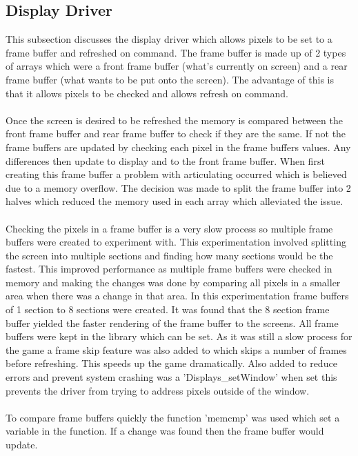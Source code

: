 \documentclass[a4paper,12pt]{article}
\begin{document}
\subsection{Display Driver}
\begin{flushleft}
This subsection discusses the display driver which allows pixels to be set to a frame buffer and refreshed on command. The frame buffer is made up of 2 types of arrays which were a front frame buffer (what's currently on screen) and a rear frame buffer (what wants to be put onto the screen). The advantage of this is that it allows pixels to be checked and allows refresh on command. 
\\ \- \\
 Once the screen is desired to be refreshed the memory is compared between the front frame buffer and rear frame buffer to check if they are the same. If not the frame buffers are updated by checking each pixel in the frame buffers values. Any differences then update to display and to the front frame buffer. When first creating this frame buffer a problem with articulating occurred which is believed due to a memory overflow. The decision was made to split the frame buffer into 2 halves which reduced the memory used in each array which alleviated the issue. \\ \- \\
Checking the pixels in a frame buffer is a very slow process so multiple frame buffers were created to experiment with. This experimentation involved splitting the screen into multiple sections and finding how many sections would be the fastest. This improved performance as multiple frame buffers were checked in memory and making the changes was done by comparing all pixels in a smaller area when there was a change in that area. In this experimentation frame buffers of 1 section to 8 sections were created. It was found that the 8 section frame buffer yielded the faster rendering of the frame buffer to the screens. All frame buffers were kept in the library which can be set. As it was still a slow process for the game a frame skip feature was also added to which skips a number of frames before refreshing. This speeds up the game dramatically. Also added to reduce errors and prevent system crashing was a 'Displays\_setWindow' when set this prevents the driver from trying to address pixels outside of the window.
\\ \- \\
To compare frame buffers quickly the function 'memcmp' was used which set a variable in the function. If a change was found then the frame buffer would update.

\end{flushleft}
\end{document}
